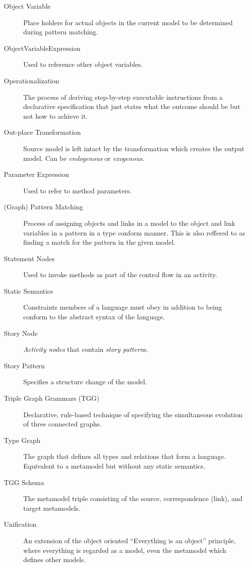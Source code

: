 \begin{description}
\item[Object Variable] %
Place holders for actual objects in the current model to be determined during pattern matching.

\item[ObjectVariableExpression] %
Used to reference other object variables.

\item[Operationalization] %
The process of deriving step-by-step executable instructions from a declarative specification that just states what the outcome should
be but not how to achieve it.

\item[Out-place Transformation] %
Source model is left intact by the transformation which creates the output model. Can be \emph{endogenous} or \emph{exogenous}.

\item[Parameter Expression]  %
Used to refer to method parameters.

\item[(Graph) Pattern Matching] %
Process of assigning objects and links in a model to the object and link variables in a pattern in a type conform manner. This is also reffered to as finding a
match for the pattern in the given model.

\item[Statement Nodes] %
Used to invoke methods as part of the control flow in an activity.

\item[Static Semantics] %
Constraints members of a language must obey in addition to being conform to the abstract syntax of the language.

\item[Story Node] %
\emph{Activity nodes} that contain \emph{story pattern}s.

\item[Story Pattern] %
Specifies a structure change of the model.

\item[Triple Graph Grammars (TGG)] %
Declarative, rule-based technique of specifying the simultaneous evolution of three connected graphs.

\item[Type Graph] %
The graph that defines all types and relations that form a language. Equivalent to a metamodel but without any static semantics.

\item[TGG Schema] %
The metamodel triple consisting of the source, correspondence (link), and target metamodels.

\item[Unification]  %
An extension of the object oriented ``Everything is an object'' principle, where everything is regarded as a model, even the metamodel which defines other
models.

\end{description}
